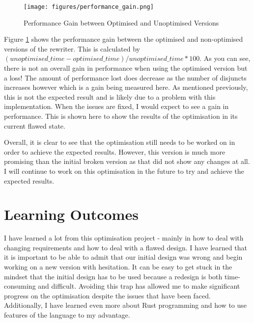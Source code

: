 \begin{figure}
	\centering
	\texttt{[image: figures/performance\_gain.png]}
	\caption{Performance Gain between Optimised and Unoptimised Versions}
	\label{fig:performance-gain}
\end{figure}

Figure \ref{fig:performance-gain} shows the performance gain between the
optimised and non-optimised versions of the rewriter. This is calculated by
$(unoptimised\_time - optimised\_time) / unoptimised\_time * 100$. As you can
see, there is not an overall gain in performance when using the optimised
version but a loss! The amount of performance lost does decrease as the number
of disjuncts increases however which is a gain being measured here.  As
mentioned previously, this is not the expected result and is likely due to a
problem with this implementation. When the issues are fixed, I would expect to
see a gain in performance. This is shown here to show the results of the
optimisation in its current flawed state.

Overall, it is clear to see that the optimisation still needs to be worked on
in order to achieve the expected results. However, this version is much more promising
than the initial broken version as that did not show any changes at all. I will
continue to work on this optimisation in the future to try and achieve the
expected results.

\section{Learning Outcomes}

I have learned a lot from this optimisation project - mainly in how to deal
with changing requirements and how to deal with a flawed design. I have learned
that it is important to be able to admit that our initial design was wrong and
begin working on a new version with hesitation. It can be easy to get stuck in
the mindset that the initial design has to be used because a redesign is both
time-consuming and difficult. Avoiding this trap has allowed me to make significant
progress on the optimisation despite the issues that have been faced. Additionally,
I have learned even more about Rust programming and how to use features of
the language to my advantage.
